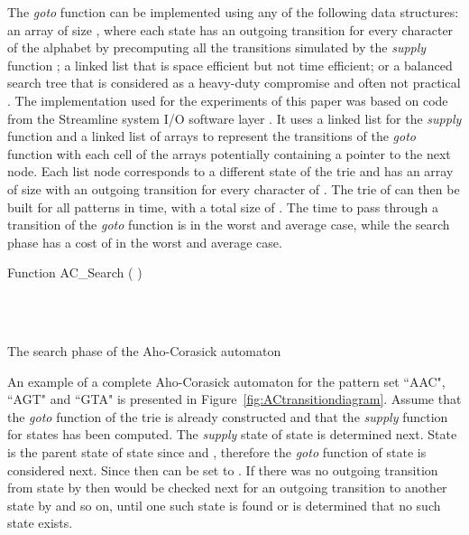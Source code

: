\documentclass{ws-ijait}
\begin{document}
The \textit{goto} function can be implemented using any of the following data structures: an array of size , where each state has an outgoing transition for every character of the alphabet by precomputing all the transitions simulated by the \textit{supply} function \cite{Navarro2002}; a linked list that is space efficient but not time efficient; or a balanced search tree that is considered as a heavy-duty compromise and often not practical \cite{Dori2006}. The implementation used for the experiments of this paper was based on code from the Streamline system I/O software layer \cite{WEB03}. It uses a linked list for the \textit{supply} function and a linked list of arrays to represent the transitions of the \textit{goto} function with each cell of the arrays potentially containing a pointer to the next node. Each list node corresponds to a different state of the trie and has an array of size  with an outgoing transition for every character of . The trie of  can then be built for all  patterns in  time, with a total size of . The time to pass through a transition of the \textit{goto} function is  in the worst and average case, while the search phase has a cost of  in the worst and average case.

\begin{algorithm}[H]

Function AC\_Search (  )\\

\\
\For{ } {
	
	\While{  }{
			
		\\
	}
	
	\\
	
}

\caption{The search phase of the Aho-Corasick automaton}
\label{compl:aho_corasick_search}
\end{algorithm}

An example of a complete Aho-Corasick automaton for the pattern set ``AAC", ``AGT" and ``GTA" is presented in Figure~\ref{fig:ACtransitiondiagram}. Assume that the \textit{goto} function of the trie is already constructed and that the \textit{supply} function for states  has been computed. The \textit{supply} state of state  is determined next. State  is the parent state of state  since  and , therefore the \textit{goto} function of state  is considered next. Since  then  can be set to . If there was no outgoing transition from state  by  then  would be checked next for an outgoing transition to another state by  and so on, until one such state is found or is determined that no such state exists.
\end{document}
